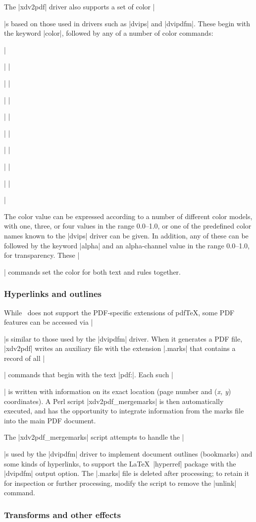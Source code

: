 The |xdv2pdf| driver also supports a set of color |\special|s based on those used in drivers such as |dvips| and |dvipdfm|. These begin with the keyword |color|, followed by any of a number of color commands:
{\obeylines \parskip0pt \parindent
	||
	||
	||
	||
	||
	||
	||
	||
	||\par}\noindent
The color value can be expressed according to a number of different color models, with one, three, or four values in the range 0.0–1.0, or one of the predefined color names known to the |dvips| driver can be given. In addition, any of these can be followed by the keyword |alpha| and an alpha-channel value in the range 0.0–1.0, for transparency. These |\special| commands set the color for both text and rules together.

\subsubsection{Hyperlinks and outlines}

While \XeTeX\ does not support the PDF-specific extensions of pdf\TeX, some PDF features can be accessed via |\special|s similar to those used by the |dvipdfm| driver. When it generates a PDF file, |xdv2pdf| writes an auxiliary file with the extension |.marks| that contains a record of all |\special| commands that begin with the text |pdf:|. Each such |\special| is written with information on its exact location (page number and ({\em x, y}) coordinates). A Perl script |xdv2pdf_mergemarks| is then automatically executed, and has the opportunity to integrate information from the marks file into the main PDF document.

The |xdv2pdf_mergemarks| script attempts to handle the |\special|s used by the |dvipdfm| driver to implement document outlines (bookmarks) and some kinds of hyperlinks, to support the \LaTeX\ |hyperref| package with the |dvipdfm| output option. The |.marks| file is deleted after processing; to retain it for inspection or further processing, modify the script to remove the |unlink| command.

\subsubsection{Transforms and other effects}

